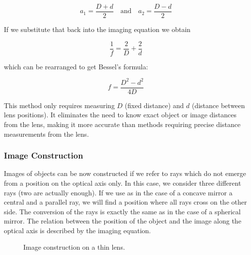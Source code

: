 \documentclass[
  a4paper,
]{book}
\begin{document}
\begin{tcolorbox}
\[a_1 = \frac{D + d}{2} \quad \text{and} \quad a_2 = \frac{D - d}{2}\]

If we substitute that back into the imaging equation we obtain

\[\frac{1}{f} = \frac{2}{D} + \frac{2}{d}\]

which can be rearranged to get Bessel's formula:

\[f = \frac{D^2 - d^2}{4D}\]

This method only requires measuring \(D\) (fixed distance) and \(d\)
(distance between lens positions). It eliminates the need to know exact
object or image distances from the lens, making it more accurate than
methods requiring precise distance measurements from the lens.

\end{tcolorbox}

\subsubsection{Image Construction}\label{image-construction}

Images of objects can be now constructed if we refer to rays which do
not emerge from a position on the optical axis only. In this case, we
consider three different rays (two are actually enough). If we use as in
the case of a concave mirror a central and a parallel ray, we will find
a position where all rays cross on the other side. The conversion of the
rays is exactly the same as in the case of a spherical mirror. The
relation between the position of the object and the image along the
optical axis is described by the imaging equation.

\begin{figure}


\caption{\label{fig-thin-lens-imaging}Image construction on a thin
lens.}

\end{figure}%
\end{document}
